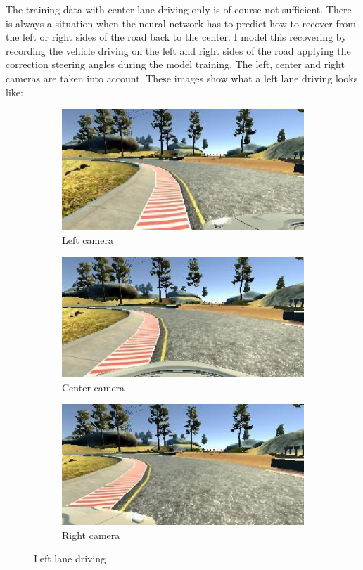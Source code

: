 \documentclass[a4paper,12pt]{article}
\begin{document}
The training data with center lane driving only is of course not sufficient. There is always a situation when the neural network has to predict how to recover from the left or right sides of the road back to the center. I model this recovering by recording the vehicle driving on the left and right sides of the road applying the correction steering angles during the model training. The left, center and right cameras are taken into account. These images show what a left lane driving looks like:

\begin{figure}[H]
\centering
\begin{subfigure}{.3\textwidth}
  \centering
  \includegraphics[width=0.98\linewidth]{figures/left_left.eps}
  \caption{Left camera}
\end{subfigure}
\begin{subfigure}{.3\textwidth}
  \centering
  \includegraphics[width=0.98\linewidth]{figures/left_center.eps}
  \caption{Center camera}
\end{subfigure}
\begin{subfigure}{.3\textwidth}
  \centering
  \includegraphics[width=0.98\linewidth]{figures/left_right.eps}
  \caption{Right camera}
\end{subfigure}
\label{fig:left_lane_driving}
\caption{Left lane driving}
\end{figure}
\end{document}

